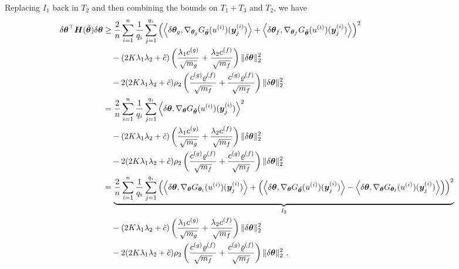 Replacing $I_1$ back in $T_2$ and then combining the bounds on $T_1+T_3$ and $T_2$, we have
\begin{equation}
\label{eq:Hess_tildetheta}
\begin{aligned}
    \delta \vtheta^{\top} \mH (\tilde{\vtheta}) \delta \vtheta  
&\geq \frac{2}{n} \sum_{i=1}^n \frac{1}{q_i} \sum_{j=1}^{q_i}  \left(\left\langle \delta \vtheta_g ,  \nabla_{\vtheta_g} G_{\tilde{\vtheta}}(u^{(i)})(\vy^{(i)}_j) \right\rangle
+
\left\langle \delta \vtheta_f ,  \nabla_{\vtheta_f} G_{\tilde{\vtheta}}(u^{(i)})(\vy^{(i)}_j) \right\rangle
\right)^2\\
&\quad- 
    (2K\lambda_1\lambda_2+\tilde{c})
    \left(\frac{\lambda_1 c^{(g)}}{\sqrt{m_g}} + \frac{\lambda_2 c^{(f)}}{\sqrt{m_f}}\right) \| \delta \vtheta \|_2^2\\
& \quad- 2(2K\lambda_1\lambda_2+\tilde{c})\rho_2 \left( \frac{c^{(g)} \varrho^{(f)}}{\sqrt{m_f}} + \frac{c^{(g)} \varrho^{(f)}}{\sqrt{m_f}} \right) \| \delta \vtheta \|_2^2\\
%
&=\frac{2}{n} \sum_{i=1}^n \frac{1}{q_i} \sum_{j=1}^{q_i}  \left\langle \delta \vtheta ,  \nabla_{\vtheta} G_{\tilde{\vtheta}}(u^{(i)})(\vy^{(i)}_j) \right\rangle
^2\\
&\quad- 
    (2K\lambda_1\lambda_2+\tilde{c})
    \left(\frac{\lambda_1 c^{(g)}}{\sqrt{m_g}} + \frac{\lambda_2 c^{(f)}}{\sqrt{m_f}}\right) \| \delta \vtheta \|_2^2\\
& \quad- 2(2K\lambda_1\lambda_2+\tilde{c})\rho_2 \left( \frac{c^{(g)} \varrho^{(f)}}{\sqrt{m_f}} + \frac{c^{(g)} \varrho^{(f)}}{\sqrt{m_f}} \right) \| \delta \vtheta \|_2^2\\
%
&=\underbrace{\frac{2}{n} \sum_{i=1}^n \frac{1}{q_i} \sum_{j=1}^{q_i}  \left(\left\langle \delta \vtheta ,  \nabla_{\vtheta} G_{\vtheta_t}(u^{(i)})(\vy^{(i)}_j) \right\rangle+\left(\left\langle \delta \vtheta ,  \nabla_{\vtheta} G_{\tilde{\vtheta}}(u^{(i)})(\vy^{(i)}_j) \right\rangle
-
\left\langle \delta \vtheta ,  \nabla_{\vtheta} G_{\vtheta_t}(u^{(i)})(\vy^{(i)}_j) \right\rangle
\right)\right)
^2}_{I_2}\\
&\quad- 
    (2K\lambda_1\lambda_2+\tilde{c})
    \left(\frac{\lambda_1 c^{(g)}}{\sqrt{m_g}} + \frac{\lambda_2 c^{(f)}}{\sqrt{m_f}}\right) \| \delta \vtheta \|_2^2\\
& \quad- 2(2K\lambda_1\lambda_2+\tilde{c})\rho_2 \left( \frac{c^{(g)} \varrho^{(f)}}{\sqrt{m_f}} + \frac{c^{(g)} \varrho^{(f)}}{\sqrt{m_f}} \right) \| \delta \vtheta \|_2^2
%
%
~.
\end{aligned}
\end{equation}
